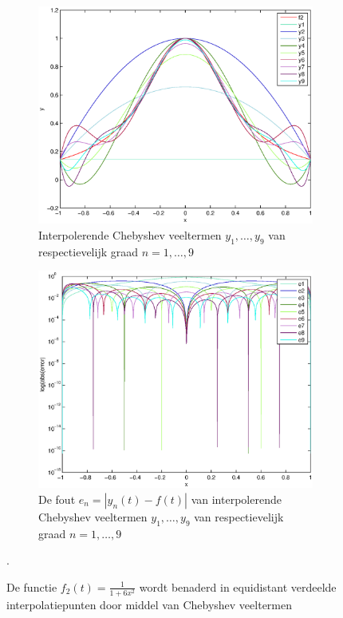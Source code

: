 \documentclass[a4paper]{article}
\begin{document}
\begin{figure}
    \centering
    \begin{subfigure}[t]{\textwidth}
        \centering
        \includegraphics[width=\textwidth]{Jona/linspace_f2_interpolation.eps}
        \caption{Interpolerende Chebyshev veeltermen $y_{1},\dots,y_{9}$ van respectievelijk graad $n=1,\dots,9$}
        \label{fig:lin_f2_interpol}
    \end{subfigure}
    \begin{subfigure}[t]{\textwidth}
        \centering
        \includegraphics[width=\textwidth]{Jona/linspace_f2_error.eps}
        \caption{De fout $e_{n} = |y_{n}(t)-f(t)|$ van interpolerende Chebyshev veeltermen $y_{1},\dots,y_{9}$ van respectievelijk graad $n=1,\dots,9$}
        \label{fig:lin_f2_error}
    \end{subfigure}
    \hfill
    \caption{De functie $f_{2}(t) = \frac{1}{1+6x^{2}}$ wordt benaderd in equidistant verdeelde interpolatiepunten door middel van Chebyshev veeltermen}\label{fig:lin_f2}.
\end{figure}
\end{document}
